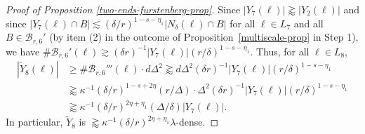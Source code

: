 \documentclass{amsart}
\numberwithin{equation}{section}
\newcommand{\de}{\delta}
\newcommand{\De}{\Delta}
\newcommand{\la}{\lambda}
\newcommand{\cb}{\mathcal B}
\begin{document}
\begin{proof}[Proof of Proposition \ref{two-ends-furstenberg-prop}]
Since $|Y_7(\ell)|\gtrapprox |Y_2(\ell)|$ and since 
$|Y_7(\ell)\cap B|\lesssim (\de/r)^{1-s-\eta_1}|N_\de(\ell)\cap B|$ for all $\ell\in L_7$ and all $B\in \cb_{r,6}'$  (by item (2) in the outcome of Proposition~\ref{multiscale-prop} in Step 1), we have $\#\cb_{r,6}'(\ell)\gtrsim (\de r)^{-1}|Y_7(\ell)| (r/\de)^{1-s-\eta_1}$. 
Thus, for all $\ell\in L_8$,
\begin{align}
    |\tilde Y_8(\ell)|&\geq \#\cb_{r,6}'''(\ell)\cdot d\De^2\gtrapprox d\De^2(\de r)^{-1}|Y_7(\ell)| (r/\de)^{1-s-\eta_1}\\
    &\gtrapprox \kappa^{-1}(\de/r)^{1-s+2\eta}(r/\De)\cdot \De^2(\de r)^{-1}|Y_7(\ell)| (r/\de)^{1-s-\eta_1}\\
    &\gtrapprox \kappa^{-1}(\de/r)^{2\eta+\eta_1}(\De/\de)|Y_7(\ell)|.
\end{align}
In particular, $\tilde Y_8$ is $\gtrapprox \kappa^{-1}(\de/r)^{2\eta+\eta_1}\la$-dense.



\end{proof}
\end{document}
